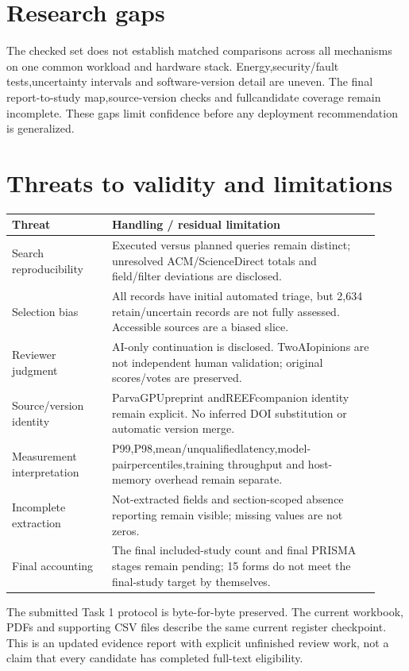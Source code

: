 \documentclass[12pt,a4paper]{article}
\begin{document}
\section{Research gaps}

The checked set does not establish matched comparisons across all mechanisms on one common workload and hardware stack. Energy,security/\allowbreak{}fault tests,uncertainty intervals and software-version detail are uneven. The final report-to-study map,source-version checks and fullcandidate coverage remain incomplete. These gaps limit confidence before any deployment recommendation is generalized.



\section{Threats to validity and limitations}


{\small\begin{longtable}{>{\raggedright\arraybackslash}p{0.25\linewidth}>{\raggedright\arraybackslash}p{0.67\linewidth}}
\toprule
Threat & Handling /\allowbreak{} residual limitation\\\midrule
\endhead
Search reproducibility & Executed versus planned queries remain distinct; unresolved ACM/\allowbreak{}ScienceDirect totals and field/\allowbreak{}filter deviations are disclosed.\\
Selection bias & All records have initial automated triage, but 2,634 retain/\allowbreak{}uncertain records are not fully assessed. Accessible sources are a biased slice.\\
Reviewer judgment & AI-only continuation is disclosed. TwoAIopinions are not independent human validation; original scores/\allowbreak{}votes are preserved.\\
Source/\allowbreak{}version identity & ParvaGPUpreprint andREEFcompanion identity remain explicit. No inferred DOI substitution or automatic version merge.\\
Measurement interpretation & P99,P98,mean/\allowbreak{}unqualifiedlatency,model-pairpercentiles,training throughput and host-memory overhead remain separate.\\
Incomplete extraction & Not-extracted fields and section-scoped absence reporting remain visible; missing values are not zeros.\\
Final accounting & The final included-study count and final PRISMA stages remain pending; 15 forms do not meet the final-study target by themselves.\\
\bottomrule
\end{longtable}}

The submitted Task 1 protocol is byte-for-byte preserved. The current workbook, PDFs and supporting CSV files describe the same current register checkpoint. This is an updated evidence report with explicit unfinished review work, not a claim that every candidate has completed full-text eligibility.


\clearpage
\end{document}
